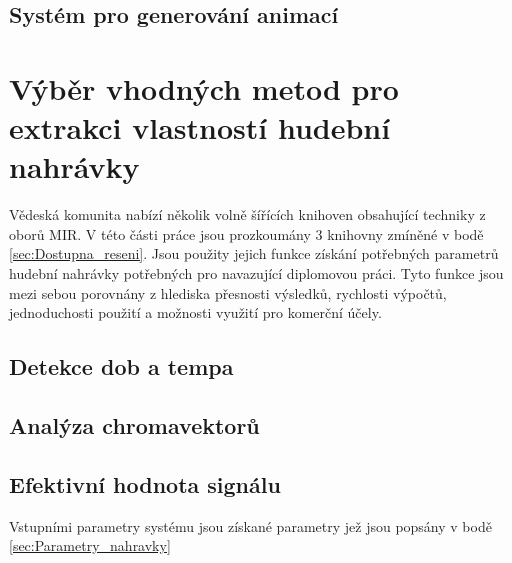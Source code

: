 \subsection{Systém pro generování animací} \label{sec:System_generovani_animaci}

\section{Výběr vhodných metod pro extrakci vlastností hudební nahrávky} \label{sec:Exktrakce_vlastnosti_metody}

Vědeská komunita nabízí několik volně šířících knihoven obsahující techniky z oborů MIR. V této části práce jsou prozkoumány 3 knihovny zmíněné v bodě \ref{sec:Dostupna_reseni}. Jsou použity jejich funkce získání potřebných parametrů hudební nahrávky potřebných pro navazující diplomovou práci. Tyto funkce jsou mezi sebou porovnány z hlediska přesnosti výsledků, rychlosti výpočtů, jednoduchosti použití a možnosti využití pro komerční účely. 

\subsection{Detekce dob a tempa}

\subsection{Analýza chromavektorů}

\subsection{Efektivní hodnota signálu}


Vstupními parametry systému jsou získané parametry jež jsou popsány v bodě \ref{sec:Parametry_nahravky} 

